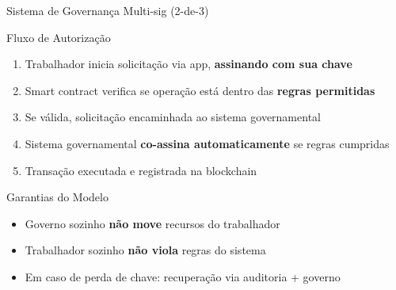 \documentclass{libs/ufc_format}
\begin{document}
\begin{frame}{Sistema de Governança Multi-sig (2-de-3)}
\end{frame}

\begin{frame}{Fluxo de Autorização}
    \begin{enumerate}
        \item Trabalhador inicia solicitação via app, \textbf{assinando com sua chave}
        \item Smart contract verifica se operação está dentro das \textbf{regras permitidas}
        \item Se válida, solicitação encaminhada ao sistema governamental
        \item Sistema governamental \textbf{co-assina automaticamente} se regras cumpridas
        \item Transação executada e registrada na blockchain
    \end{enumerate}

    \vspace{0.3cm}

    \begin{alertblock}{Garantias do Modelo}
        \begin{itemize}
            \item Governo sozinho \textbf{não move} recursos do trabalhador
            \item Trabalhador sozinho \textbf{não viola} regras do sistema
            \item Em caso de perda de chave: recuperação via auditoria + governo
        \end{itemize}
    \end{alertblock}
\end{frame}
\end{document}
